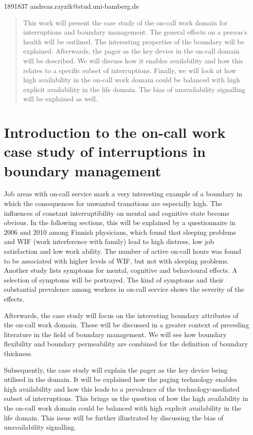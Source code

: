 \documentclass{CML_Seminar_Template}
\begin{document}

\author{Andreas Rayzik}
       {1891837}
       {andreas.rayzik@stud.uni-bamberg.de}

\begin{abstract}
This work will present the case study of the on-call work domain for interruptions and boundary management. The general effects on a person's health will be outlined. The interesting properties of the boundary will be explained. Afterwards, the pager as the key device in the on-call domain will be described. We will discuss how it enables availability and how this relates to a specific subset of interruptions. Finally, we will look at how high availability in the on-call work domain could be balanced with high explicit availability in the life domain. The bias of unavailability signalling will be explained as well.
\end{abstract}

\vspace{24pt}

\section{Introduction to the on-call work case study of interruptions in boundary management}

Job areas with on-call service mark a very interesting example of a boundary in which the consequences for unwanted transitions are especially high. The influences of constant interruptibility on mental and cognitive state become obvious. In the following sections, this will be explained by a questionnaire in 2006 and 2010 among Finnish physicians, which found that sleeping problems and WIF (work interference with family) lead to high distress, low job satisfaction and low work ability. The number of active on-call hours was found to be associated with higher levels of WIF, but not with sleeping problems.
Another study lists symptoms for mental, cognitive and behavioural effects. A selection of symptoms will be portrayed. The kind of symptoms and their substantial prevalence among workers in on-call service shows the severity of the effects.
\par
Afterwards, the case study will focus on the interesting boundary attributes of the on-call work domain. These will be discussed in a greater context of preceding literature in the field of boundary management. We will see how boundary flexibility and boundary permeability are combined for the definition of boundary thickness.
\par
Subsequently, the case study will explain the pager as the key device being utilised in the domain. It will be explained how the paging technology enables high availability and how this leads to a prevalence of the technology-mediated subset of interruptions. This brings us the question of how the high availability in the on-call work domain could be balanced with high explicit availability in the life domain. This issue will be further illustrated by discussing the bias of unavailability signalling.
\end{document}
